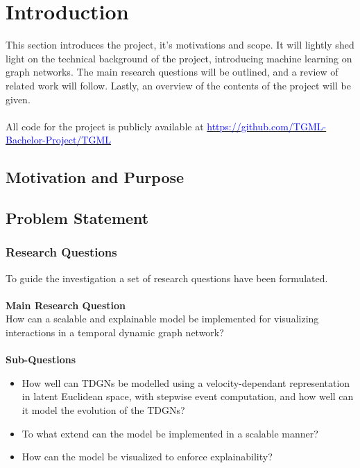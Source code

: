 \section{Introduction}
\label{sec:Intro}

This section introduces the project, it's motivations and scope.
It will lightly shed light on the technical background of the project, introducing machine learning on graph networks.
The main research questions will be outlined, and a review of related work will follow.
Lastly, an overview of the contents of the project will be given.
\\\\
All code for the project is publicly available at \href{https://github.com/TGML-Bachelor-Project/TGML}{\textcolor{blue}{https://github.com/TGML-Bachelor-Project/TGML}}


\subsection{Motivation and Purpose}
\label{sec:Intro:Motivation}

\subsection{Problem Statement}
\label{sec:Intro:ProblemStatement}


\subsubsection{Research Questions} 
\label{sec:Intro:ResearchQs}
To guide the investigation a set of research questions have been formulated.
\\\\
\textbf{Main Research Question}
\\
How can a scalable and explainable model be implemented for visualizing interactions in a temporal dynamic graph network?
\\\\
\textbf{Sub-Questions}
\begin{itemize}
    \item How well can TDGNs be modelled using a velocity-dependant representation in latent Euclidean space, with stepwise event computation, and how well can it model the evolution of the TDGNs?
    
   \item To what extend can the model be implemented in a scalable manner?
   
   \item How can the model be visualized to enforce explainability?
   
\end{itemize}


